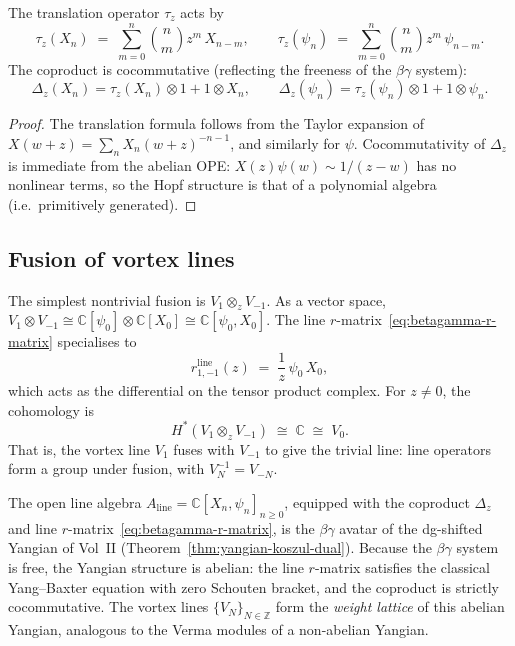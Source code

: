 \begin{proposition}
\label{prop:betagamma-translation-coproduct}
\ClaimStatusProvedHere
{}
The translation operator $\tau_z$ acts by
\[
 \tau_z(X_n)
 \;=\;
 \sum_{m=0}^{n} \binom{n}{m} z^m\, X_{n-m},
 \qquad
 \tau_z(\psi_n)
 \;=\;
 \sum_{m=0}^{n} \binom{n}{m} z^m\, \psi_{n-m}.
\]
The coproduct is cocommutative (reflecting the freeness of the
$\beta\gamma$ system):
\[
 \Delta_z(X_n) = \tau_z(X_n) \otimes 1 + 1 \otimes X_n,
 \qquad
 \Delta_z(\psi_n) = \tau_z(\psi_n) \otimes 1 + 1 \otimes \psi_n.
\]
\end{proposition}

\begin{proof}
The translation formula follows from the Taylor expansion of
$X(w+z) = \sum_n X_n (w+z)^{-n-1}$, and similarly for $\psi$.
Cocommutativity of $\Delta_z$ is immediate from the abelian OPE:
$X(z)\psi(w) \sim 1/(z-w)$ has no nonlinear terms, so the Hopf
structure is that of a polynomial algebra (i.e.\ primitively
generated).\qedhere
\end{proof}

\subsection{Fusion of vortex lines}

\begin{example}
\label{ex:betagamma-v1-vm1-ope}
The simplest nontrivial fusion is $V_1 \otimes_z V_{-1}$.
As a vector space, $V_1 \otimes V_{-1} \cong
\mathbb{C}[\psi_0] \otimes \mathbb{C}[X_0]
\cong \mathbb{C}[\psi_0, X_0]$.
The line $r$-matrix~\eqref{eq:betagamma-r-matrix} specialises to
\[
 r^{\mathrm{line}}_{1,-1}(z)
 \;=\;
 \frac{1}{z}\,\psi_0\, X_0,
\]
which acts as the differential on the tensor product complex. For
$z \neq 0$, the cohomology is
\[
 H^*(V_1 \otimes_z V_{-1})
 \;\cong\;
 \mathbb{C}
 \;\cong\;
 V_0.
\]
That is, the vortex line $V_1$ fuses with $V_{-1}$ to give the
trivial line: line operators form a group under fusion, with
$V_N^{-1} = V_{-N}$.
\end{example}

\begin{remark}
\label{rem:betagamma-dg-yangian}
The open line algebra
$A_{\mathrm{line}} = \mathbb{C}[X_n,\psi_n]_{n \ge 0}$, equipped with
the coproduct $\Delta_z$ and line
$r$-matrix~\eqref{eq:betagamma-r-matrix}, is the $\beta\gamma$
avatar of the dg-shifted Yangian of Vol~II
(Theorem~\ref{thm:yangian-koszul-dual}). Because the $\beta\gamma$
system is free, the Yangian structure is abelian: the line
$r$-matrix satisfies the classical Yang--Baxter equation with zero
Schouten bracket, and the coproduct is strictly cocommutative.
The vortex lines $\{V_N\}_{N \in \mathbb{Z}}$ form the
\emph{weight lattice} of this abelian Yangian, analogous to the
Verma modules of a non-abelian Yangian.
\end{remark}

